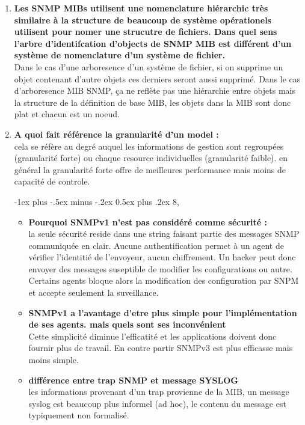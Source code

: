 \documentclass[12pt,landscape]{article}
\makeatletter
\renewcommand{\section}{\@startsection{section}{1}{0mm}%
                                {-1ex plus -.5ex minus -.2ex}%
                                {0.5ex plus .2ex}%
                                {\normalfont\large\bfseries}}
\makeatother
\begin{document}
\begin{multicols}{2}
\begin{enumerate}
\item \textbf{Les SNMP MIBs utilisent une nomenclature hiérarchic très similaire à la structure de beaucoup de système opérationels utilisent pour nomer une strucutre de fichiers. Dans quel sens l'arbre d'identifcation d'objects de SNMP MIB est différent d'un système de nomenclature d'un système de fichier.}\\
Dans le cas d'une arboresence d'un système de fichier, si on supprime un objet contenant d'autre objets ces derniers seront aussi supprimé.
Dans le cas d'arboresence MIB SNMP, ça ne reflète pas une hiérarchie entre objets mais la structure de la définition de base MIB, les objets dans la MIB sont donc plat et chacun est un noeud.

\item \textbf{A quoi fait référence la granularité d'un model :}\\
cela se réfère au degré auquel les informations de gestion sont regroupées (granularité forte) ou chaque resource individuelles (granularité faible). en général la granularité forte offre de meilleures performance mais moins de capacité de controle.

\section{8,}
\begin{itemize}
 \item \textbf{Pourquoi SNMPv1 n'est pas considéré comme sécurité : }\\
 la seule sécurité reside dans une string faisant partie des messages SNMP communiquée en clair. Aucune authentification permet à un agent de vérifier l'identitié de l'envoyeur, aucun chiffrement. Un hacker peut donc envoyer des messages suseptible de modifier les configurations ou autre. Certains agents bloque alors la modification des configuration par SNPM et accepte seulement la suveillance.
 
 \item \textbf{SNMPv1 a l'avantage d'etre plus simple pour l'implémentation de ses agents. mais quels sont ses inconvénient}\\
 Cette simplicité diminue l'efficatité et les applications doivent donc fournir plus de travail. En contre partir SNMPv3 est plus efficasse mais moins simple.
 
 \item \textbf{différence entre trap SNMP et message SYSLOG}\\
 les informations provenant d'un trap provienne de la MIB, un message syslog est beaucoup plus informel (ad hoc), le contenu du message est typiquement non formalisé.
 

\end{itemize}
\end{enumerate}
\end{multicols}
\end{document}
